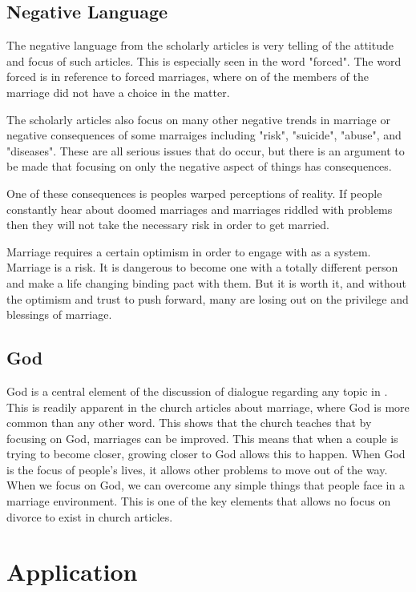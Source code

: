 \documentclass[twocolumn]{article}
\begin{document}
\subsection{Negative Language}


The negative language from the scholarly articles is very telling of the attitude and focus of such articles. This is especially seen in the word "forced". The word forced is in reference to forced marriages, where on of the members of the marriage did not have a choice in the matter.

The scholarly articles also focus on many other negative trends in marriage or negative consequences of some marraiges including "risk", "suicide", "abuse", and "diseases". These are all serious issues that do occur, but there is an argument to be made that focusing on only the negative aspect of things has consequences. 


One of these consequences is peoples warped perceptions of reality. If people constantly hear about doomed marriages and marriages riddled with problems then they will not take the necessary risk in order to get married. 

Marriage requires a certain optimism in order to engage with as a system. Marriage is a risk. It is dangerous to become one with a totally different person and make a life changing binding pact with them. But it is worth it, and without the optimism and trust to push forward, many are losing out on the privilege and blessings of marriage. 

\subsection{God}

God is a central element of the discussion of dialogue regarding any topic in \church. This is readily apparent in the church articles about marriage, where God is more common than any other word. This shows that the church teaches that by focusing on God, marriages can be improved. This means that when a couple is trying to become closer, growing closer to God allows this to happen. When God is the focus of people's lives, it allows other problems to move out of the way. When we focus on God, we can overcome any simple things that people face in a marriage environment. This is one of the key elements that allows no focus on divorce to exist in church articles.

\section{Application}
\end{document}

